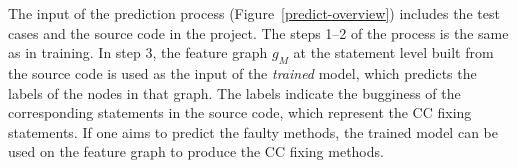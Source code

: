 The input of the prediction process (Figure~\ref{predict-overview})
includes the test cases and the source code in the project. The steps
1--2 of the process is the same as in training. In step 3, the feature
graph $g_M$ at the statement level built from the source code is
used as the input of the {\em trained}  model, which
predicts the labels of the nodes in that graph. The labels indicate
the bugginess of the corresponding statements in the source
code, which represent the CC fixing statements. If one aims to predict
the faulty methods, the trained  model can be used on the
feature graph to produce the CC fixing methods.



